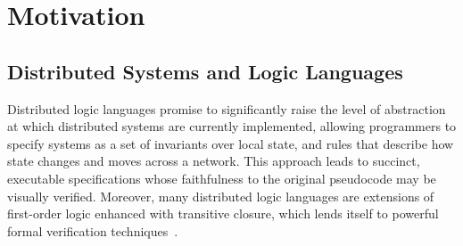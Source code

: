 \section{Motivation}

\subsection{Distributed Systems and Logic Languages}
\label{sec:dsll}


Distributed logic languages promise to significantly raise the level of
abstraction at which distributed systems are currently implemented, allowing
programmers to specify systems as a set of invariants over local state,
and rules that describe how state changes and moves across a network. 
This approach leads to succinct, executable specifications whose faithfulness to the original pseudocode may be visually verified.
Moreover, many 
distributed logic languages are extensions of first-order logic enhanced with
transitive closure, which lends itself to powerful
formal verification techniques~\cite{wang, wang2}.

